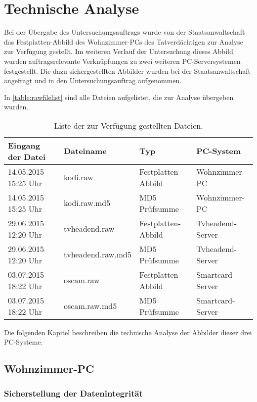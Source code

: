 \chapter{Technische Analyse}
\label{chap:analysis}

Bei der Übergabe des Untersuchungsauftrags wurde von der Staatsanwaltschaft  das Festplatten-Abbild des Wohnzimmer-PCs des Tatverdächtigen zur Analyse zur Verfügung gestellt. Im weiteren Verlauf der Untersuchung dieses Abbild wurden auftragsrelevante Verknüpfungen zu zwei weiteren PC-Serversystemen festgestellt. Die dazu sichergestellten Abbilder wurden bei der  Staatsanwaltschaft angefragt und in den Untersuchungsauftrag aufgenommen.

In \autoref{table:rawfilelist} sind alle Dateien aufgelistet, die zur Analyse übergeben wurden.

\begin{table}[h]
\begin{tabular}{llll}
\toprule
Eingang der Datei & Dateiname & Typ & PC-System \\ 
\midrule
14.05.2015 15:25 Uhr & kodi.raw & Festplatten-Abbild & Wohnzimmer-PC \\ 
14.05.2015 15:25 Uhr & kodi.raw.md5 & MD5 Prüfsumme & Wohnzimmer-PC \\ 
29.06.2015 12:20 Uhr & tvheadend.raw & Festplatten-Abbild & Tvheadend-Server \\ 
29.06.2015 12:20 Uhr & tvheadend.raw.md5 & MD5 Prüfsumme & Tvheadend-Server \\ 
03.07.2015 18:22 Uhr & oscam.raw & Festplatten-Abbild & Smartcard-Server \\ 
03.07.2015 18:22 Uhr & oscam.raw.md5 & MD5 Prüfsumme & Smartcard-Server \\ 
\bottomrule
\end{tabular} 
\caption{Liste der zur Verfügung gestellten Dateien.}
\label{table:rawfilelist}
\end{table}

Die folgenden Kapitel beschreiben die technische Analyse der Abbilder dieser drei PC-Systeme.

\section{Wohnzimmer-PC}

\subsection{Sicherstellung der Datenintegrität}

